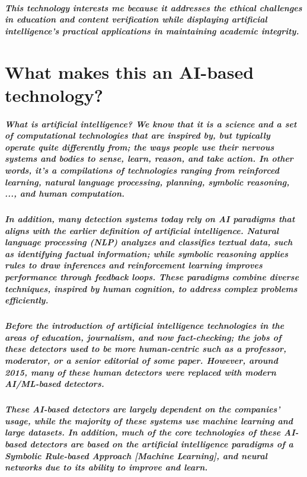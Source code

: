 \documentclass[12pt,letterpaper,final]{report}
\begin{document}
\paragraph{
This technology interests me because it addresses the ethical challenges in education and content verification while displaying artificial intelligence's practical applications in maintaining academic integrity. 
}
\chapter{What makes this an AI-based technology?}
\paragraph{
What is artificial intelligence? We know that it is a science and a set of computational technologies that are inspired by, but typically operate quite differently from; the ways people use their nervous systems and bodies to sense, learn, reason, and take action. In other words, it's a compilations of technologies ranging from reinforced learning, natural language processing, planning, symbolic reasoning, ..., and human computation.
}
\paragraph{
In addition, many detection systems today rely on AI paradigms that aligns with the earlier definition of artificial intelligence. Natural language processing (NLP) analyzes and classifies textual data, such as identifying factual information; while symbolic reasoning applies rules to draw inferences and reinforcement learning improves performance through feedback loops. These paradigms combine diverse techniques, inspired by human cognition, to address complex problems efficiently.
}
\paragraph{
Before the introduction of artificial intelligence technologies in the areas of education, journalism, and now fact-checking; the jobs of these detectors used to be more human-centric such as a professor, moderator, or a senior editorial of some paper. However, around 2015, many of these human detectors were replaced with modern AI/ML-based detectors.
}

\paragraph{
These AI-based detectors are largely dependent on the companies' usage, while the majority of these systems use machine learning and large datasets. In addition, much of the core technologies of these AI-based detectors are based on the artificial intelligence paradigms of a Symbolic Rule-based Approach [Machine Learning], and neural networks due to its ability to improve and learn.
} 
\end{document}
